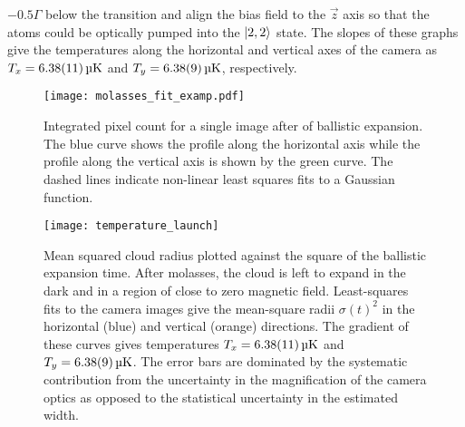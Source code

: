 \(-0.5\Gamma\) below the  transition and align the bias
field to the \(\vec{z}\) axis so that the atoms could be optically
pumped into the \(\ket{2,2}\) state. 
The slopes of these graphs give the temperatures along the horizontal and vertical axes of the
camera as \(T_x = \sivalue{6.38 \pm 0.11}{\micro\kelvin}\) and \(T_y =
\sivalue{6.38 \pm 0.09}{\micro\kelvin}\), respectively.  
\begin{figure}[htpb]
  \centering
  \texttt{[image: molasses\_fit\_examp.pdf]}
  \caption[Integrated pixel counts during ballistic
  expansion.]{Integrated pixel count for a single image after
     of ballistic expansion. The blue curve shows the profile along the horizontal axis
while the profile along the vertical axis is shown by the green curve. The dashed lines indicate non-linear least squares fits
  to a Gaussian function.}
  \label{fig:molasses_fit_examp}
\end{figure}
\begin{figure}[!htbp]
  \centering
  \texttt{[image: temperature\_launch]}
  \caption[Temperature measurement using ballistic expansion]{Mean
    squared cloud radius plotted against the square of the ballistic
    expansion time. After
    molasses, the cloud is left to expand in the dark and in a region of
    close to zero magnetic field. Least-squares fits to the camera
    images give the mean-square radii $\sigma(t)^2$ in the horizontal
    (blue) and vertical (orange) directions. 
    The gradient of these curves gives temperatures \(T_x = \sivalue{6.38 \pm0.11}{\micro\kelvin}\) and \(T_y =
  \sivalue{6.38\pm0.09}{\micro\kelvin}\). The error bars are dominated
by the systematic contribution from the uncertainty in the
magnification of the camera optics as opposed to the statistical
uncertainty in the estimated width.}
  \label{fig:molasses_temperature}
\end{figure}

